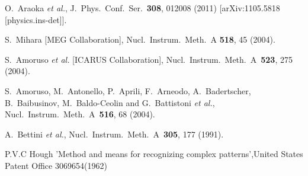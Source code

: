 \documentclass[preprint,12pt]{elsarticle}
\begin{document}









\begin{thebibliography}{00}


  O.~Araoka {\it et al.},
  J.\ Phys.\ Conf.\ Ser.\  {\bf 308}, 012008 (2011)
  [arXiv:1105.5818 [physics.ins-det]].

S.~Mihara [MEG Collaboration],
Nucl.\ Instrum.\ Meth.\ A {\bf 518}, 45 (2004).

  S.~Amoruso {\it et al.} [ICARUS Collaboration],
  Nucl.\ Instrum.\ Meth.\ A\ {\bf 523}, 275  (2004).

  S.~Amoruso, M.~Antonello, P.~Aprili, F.~Arneodo, A.~Badertscher, B.~Baibusinov, M.~Baldo-Ceolin and G.~Battistoni {\it et al.},
  Nucl.\ Instrum.\ Meth.\ A\ {\bf 516}, 68  (2004).

  A.~Bettini {\it et al.}, Nucl.\ Instrum.\ Meth.\ A\ {\bf 305}, 177 (1991).

  P.V.C Hough 'Method and means for recognizing complex patterns',United States Patent Office 3069654(1962) 

\end{thebibliography}
\end{document}
